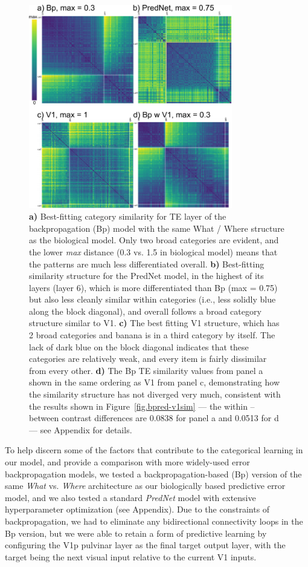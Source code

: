 \documentclass[11pt,twoside]{article}
\newif\myifpdf
\begin{document}
\begin{figure}
  \centering\includegraphics[width=3.5in]{fig_deepleabra_wwi_bp_prednet_simat}
  \caption{\footnotesize {\bf a)} Best-fitting category similarity for TE layer of the backpropagation (Bp) model with the same What / Where structure as the biological model.  Only two broad categories are evident, and the lower \emph{max} distance (0.3 vs. 1.5 in biological model) means that the patterns are much less differentiated overall.  {\bf b)} Best-fitting similarity structure for the PredNet model, in the highest of its layers (layer 6), which is more differentiated than Bp (max = 0.75) but also less cleanly similar within categories (i.e., less solidly blue along the block diagonal), and overall follows a broad category structure similar to V1. {\bf c)} The best fitting V1 structure, which has 2 broad categories and banana is in a third category by itself.  The lack of dark blue on the block diagonal indicates that these categories are relatively weak, and every item is fairly dissimilar from every other.  {\bf d)} The Bp TE similarity values from panel a shown in the same ordering as V1 from panel c, demonstrating how the similarity structure has not diverged very much, consistent with the results shown in Figure~\ref{fig.bpred-v1sim} --- the within -- between contrast differences are 0.0838 for panel a and 0.0513 for d --- see Appendix for details.}
  \label{fig.bpred}
\end{figure}

To help discern some of the factors that contribute to the categorical learning in our model, and provide a comparison with more widely-used error backpropagation models, we tested a backpropagation-based (Bp) version of the same \emph{What} vs. \emph{Where} architecture as our biologically based predictive error model, and we also tested a standard \emph{PredNet} model \citep{LotterKreimanCox16} with extensive hyperparameter optimization (see Appendix).  Due to the constraints of backpropagation, we had to eliminate any bidirectional connectivity loops in the Bp version, but we were able to retain a form of predictive learning by configuring the V1p pulvinar layer as the final target output layer, with the target being the next visual input relative to the current V1 inputs.
\end{document}
